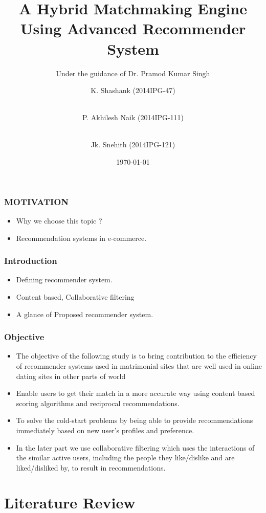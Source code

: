 \documentclass[10pt, compress]{beamer}
\title{A Hybrid Matchmaking Engine Using Advanced Recommender System }
\subtitle{Under the guidance of Dr. Pramod Kumar Singh}
\date{\today}
\author[shortname]{K. Shashank (2014IPG-47)\and\\ P. Akhilesh Naik (2014IPG-111)\and\\ Jk. Snehith (2014IPG-121) }
\institute{ABV INDIAN INSTITUTE OF INFORMATION TECHNOLOGY AND MANAGEMENT}
\begin{document}
\maketitle

\begin{frame}[fragile]
  \frametitle{MOTIVATION}
  \begin{itemize}
 \item<1> Why we choose this topic ?
 \item<1> Recommendation systems in  e-commerce.
\end{itemize}
\end{frame}

\begin{frame}[fragile]
  \frametitle{Introduction}
  \begin{itemize}
  \item<1> Defining recommender system.
  \item<1> Content based, Collaborative filtering
 \item<1> A glance of Proposed recommender system.


 \end{itemize}
\end{frame}

\begin{frame}[fragile]
  \frametitle{Objective} 
  \begin{itemize}
   \item<1> The objective of the following study is to bring contribution to the efficiency of recommender systems used in matrimonial sites that are well used in online dating sites in other parts of world 
   \item<1> Enable users to get their match in a more accurate way using content based scoring algorithms and reciprocal recommendations.
   \item<1> To solve the cold-start problems by being able to provide recommendations immediately based on new user's profiles and preference. 
   \item<1> In the later part we use  collaborative filtering which uses the interactions of the similar active users, including the people they like/dislike and are liked/disliked by, to result in recommendations.
 \end{itemize}
\end{frame}

\section{Literature Review}
\end{document}
